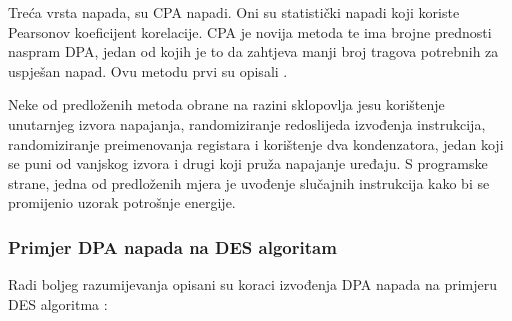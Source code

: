 \documentclass[times, utf8, diplomski]{fer}
\begin{document}
Treća vrsta napada, su CPA napadi. Oni su statistički napadi koji koriste Pearsonov koeficijent korelacije. CPA je novija metoda te ima brojne prednosti naspram DPA, jedan od kojih je to da zahtjeva manji broj tragova potrebnih za uspješan napad. Ovu metodu prvi su opisali \cite{brier2004correlation}.

Neke od predloženih metoda obrane na razini sklopovlja jesu korištenje unutarnjeg izvora napajanja, randomiziranje redoslijeda izvođenja instrukcija, randomiziranje preimenovanja registara i korištenje dva kondenzatora, jedan koji se puni od vanjskog izvora i drugi koji pruža napajanje uređaju. S programske strane, jedna od predloženih mjera je uvođenje slučajnih instrukcija kako bi se promijenio uzorak potrošnje energije.

\subsubsection{Primjer DPA napada na DES algoritam}

Radi boljeg razumijevanja opisani su koraci izvođenja DPA napada na primjeru DES algoritma \citep{standaert2010introduction}:
\end{document}
